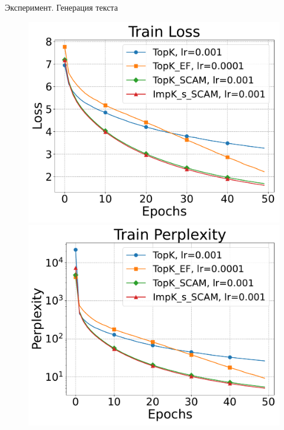 \documentclass{beamer}
\begin{document}

\begin{frame}{Эксперимент. Генерация текста}

    \begin{figure}[ht]
        \centering
        \begin{minipage}{0.4\textwidth}
            \includegraphics[width=\textwidth]{../paper/figures/gpt2/experiment2/Train Loss.pdf}
        \end{minipage}
        \begin{minipage}{0.4\textwidth}
            \includegraphics[width=\textwidth]{../paper/figures/gpt2/experiment2/Train Perplexity.pdf}

\end{minipage}
\end{figure}
\end{frame}
\end{document}
